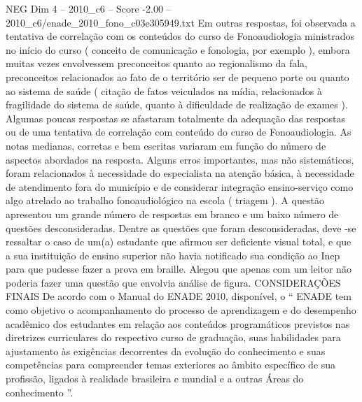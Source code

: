 \begin{textsample}{NEG Dim 4 – 2010\_c6 – Score -2.00 – 2010\_c6/enade\_2010\_fono\_c03e305949.txt}
Em outras respostas, foi observada a tentativa de correlação com os conteúdos do curso de Fonoaudiologia ministrados no início do curso ( conceito de comunicação e fonologia, por exemplo ), embora muitas vezes envolvessem preconceitos quanto ao regionalismo da fala, preconceitos relacionados ao fato de o território ser de pequeno porte ou quanto ao sistema de saúde ( citação de fatos veiculados na mídia, relacionados à fragilidade do sistema de saúde, quanto à dificuldade de realização de exames ).
Algumas poucas respostas se afastaram totalmente da adequação das respostas ou de uma tentativa de correlação com conteúdo do curso de Fonoaudiologia.
As notas medianas, corretas e bem escritas variaram em função do número de aspectos abordados na resposta.
Alguns erros importantes, mas não sistemáticos, foram relacionados à necessidade do especialista na atenção básica, à necessidade de atendimento fora do município e de considerar integração ensino-serviço como algo atrelado ao trabalho fonoaudiológico na escola ( triagem ).
A questão apresentou um grande número de respostas em branco e um baixo número de questões desconsideradas.
Dentre as questões que foram desconsideradas, deve -se ressaltar o caso de um(a) estudante que afirmou ser deficiente visual total, e que a sua instituição de ensino superior não havia notificado sua condição ao Inep para que pudesse fazer a prova em braille.
Alegou que apenas com um leitor não poderia fazer uma questão que envolvia análise de figura.
CONSIDERAÇÕES FINAIS De acordo com o Manual do ENADE 2010, disponível, o “ ENADE tem como objetivo o acompanhamento do processo de aprendizagem e do desempenho acadêmico dos estudantes em relação aos conteúdos programáticos previstos nas diretrizes curriculares do respectivo curso de graduação, suas habilidades para ajustamento às exigências decorrentes da evolução do conhecimento e suas competências para compreender temas exteriores ao âmbito específico de sua profissão, ligados à realidade brasileira e mundial e a outras Áreas do conhecimento ”.

\end{textsample}
